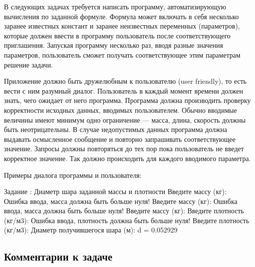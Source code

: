 
В следующих задачах требуется написать программу, автоматизирующую вычисления
по заданной формуле. Формула может включать в себя несколько заранее известных
констант и заранее неизвестных переменных (параметров), которые должен ввести
в программу пользователь после соответствующего приглашения. Запуская
программу несколько раз, вводя разные значения параметров, пользователь сможет
получать соответствующее этим параметрам решение задачи.

Приложение должно быть дружелюбным к пользователю (user friendly), то есть
вести с ним разумный диалог. Пользователь в каждый момент времени должен
знать, чего ожидает от него программа. Программа должна производить проверку
корректности исходных данных, вводимых пользователем.
Обычно вводимые величины имеют минимум одно ограничение --- масса, длина,
скорость должны быть неотрицательны.
В случае недопустимых данных программа должна выдавать осмысленное сообщение
и повторно запрашивать соответствующее значение. Запросы должны повторяться
до тех пор пока пользователь не введет корректное значение. Так должно происходить
для каждого вводимого параметра.

Примеры диалога программы и пользователя:%

\begin{zzoutput}
  Задание : Диаметр шара заданной массы и плотности
  Введите массу (кг): 
  Ошибка ввода, масса должна быть больше нуля!
  Введите массу (кг): 
  Ошибка ввода, масса должна быть больше нуля!
  Введите массу (кг): 
  Введите плотность (кг/м3): 
  Ошибка ввода, плотность должна быть больше нуля!
  Введите плотность (кг/м3): 
  Диаметр получившегося шара (м): d = 0.052929
\end{zzoutput}


\subsection*{Комментарии к задаче}


